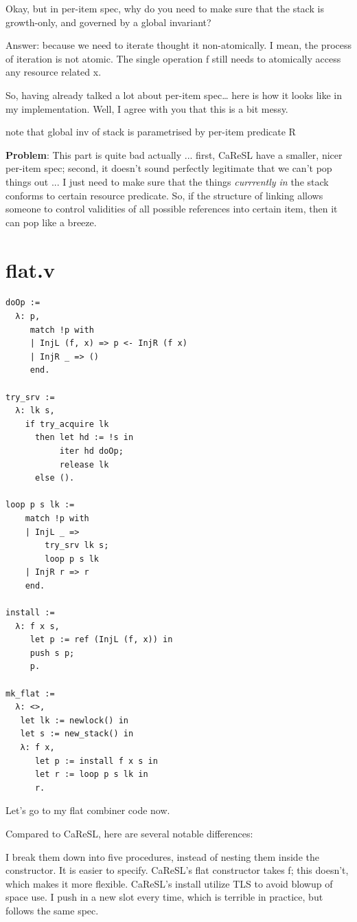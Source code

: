 \documentclass[11pt]{article}
\begin{document}
Okay, but in per-item spec, why do you need to make sure that the stack is growth-only, and governed by a global invariant?

Answer: because we need to iterate thought it non-atomically. I mean, the process of iteration is not atomic. The single operation f still needs to atomically access any resource related x.

So, having already talked a lot about per-item spec… here is how it looks like in my implementation. Well, I agree with you that this is a bit messy. 

note that global inv of stack is parametrised by per-item predicate R

\textbf{Problem}: This part is quite bad actually ... first, CaReSL have a smaller, nicer per-item spec; second, it doesn't sound perfectly legitimate that we can't pop things out ... I just need to make sure that the things \emph{currrently in} the stack conforms to certain resource predicate. So, if the structure of linking allows someone to control validities of all possible references into certain item, then it can pop like a breeze.

\section{flat.v}

\begin{verbatim}
doOp :=
  λ: p,
     match !p with
     | InjL (f, x) => p <- InjR (f x)
     | InjR _ => ()
     end.

try_srv :=
  λ: lk s,
    if try_acquire lk
      then let hd := !s in
           iter hd doOp;
           release lk
      else ().

loop p s lk :=
    match !p with
    | InjL _ =>
        try_srv lk s;
        loop p s lk
    | InjR r => r
    end.

install :=
  λ: f x s,
     let p := ref (InjL (f, x)) in
     push s p;
     p.

mk_flat :=
  λ: <>,
   let lk := newlock() in
   let s := new_stack() in
   λ: f x,
      let p := install f x s in
      let r := loop p s lk in
      r.
\end{verbatim}


Let’s go to my flat combiner code now.

Compared to CaReSL, here are several notable differences:

I break them down into five procedures, instead of nesting them inside the constructor. It is easier to specify.
CaReSL’s flat constructor takes f; this doesn’t, which makes it more flexible.
CaReSL’s install utilize TLS to avoid blowup of space use. I push in a new slot every time, which is terrible in practice, but follows the same spec.
\end{document}

